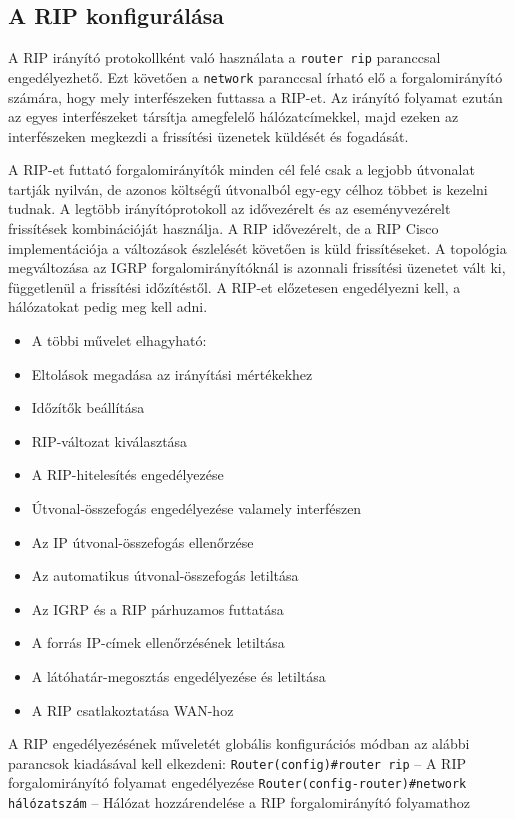 \subsection{A RIP konfigurálása}
A RIP irányító protokollként való használata a \verb|router rip| paranccsal engedélyezhető. Ezt követően a \verb|network| paranccsal írható elő a forgalomirányító számára, hogy mely  interfészeken futtassa a RIP-et. Az irányító folyamat ezután az egyes interfészeket társítja amegfelelő hálózatcímekkel, majd ezeken az interfészeken megkezdi a frissítési üzenetek küldését és fogadását.

A RIP-et futtató forgalomirányítók minden cél felé csak a legjobb útvonalat tartják nyilván, de azonos költségű útvonalból egy-egy célhoz többet is kezelni tudnak. A legtöbb irányítóprotokoll az idővezérelt és az eseményvezérelt frissítések kombinációját használja. A RIP idővezérelt, de a RIP Cisco implementációja a változások észlelését követően is küld frissítéseket. A topológia megváltozása az IGRP forgalomirányítóknál is azonnali frissítési üzenetet vált ki, függetlenül a frissítési időzítéstől. A RIP-et előzetesen engedélyezni kell, a hálózatokat pedig meg kell adni.
\begin{itemize}[nosep]
	\item A többi művelet elhagyható:
	\item Eltolások megadása az irányítási mértékekhez
	\item Időzítők beállítása
	\item RIP-változat kiválasztása
	\item A RIP-hitelesítés engedélyezése
	\item Útvonal-összefogás engedélyezése valamely interfészen
	\item Az IP útvonal-összefogás ellenőrzése
	\item Az automatikus útvonal-összefogás letiltása
	\item Az IGRP és a RIP párhuzamos futtatása
	\item A forrás IP-címek ellenőrzésének letiltása
	\item A látóhatár-megosztás engedélyezése és letiltása
	\item A RIP csatlakoztatása WAN-hoz
\end{itemize}
A RIP engedélyezésének műveletét globális konfigurációs módban az alábbi parancsok kiadásával kell elkezdeni:
\verb|Router(config)#router rip| -- A RIP forgalomirányító folyamat engedélyezése
\verb|Router(config-router)#network hálózatszám| -- Hálózat hozzárendelése a RIP forgalomirányító folyamathoz

